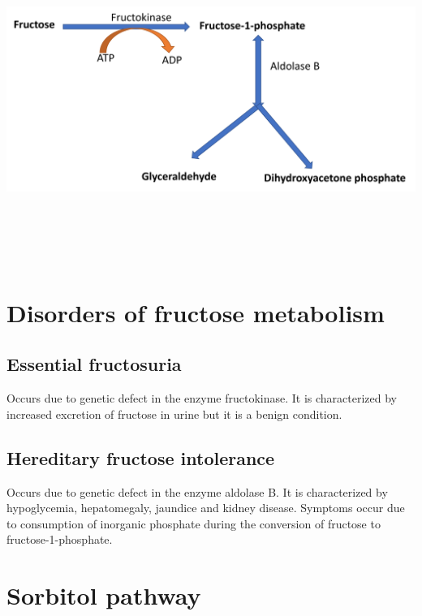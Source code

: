 \documentclass[
]{book}
\begin{document}
\includegraphics[width=\textwidth,height=4.16667in]{Images/Fructose2.png}

\section{Disorders of fructose metabolism}\label{disorders-of-fructose-metabolism}

\subsection{Essential fructosuria}\label{essential-fructosuria}

Occurs due to genetic defect in the enzyme fructokinase. It is characterized by increased excretion of fructose in urine but it is a benign condition.

\subsection{Hereditary fructose intolerance}\label{hereditary-fructose-intolerance}

Occurs due to genetic defect in the enzyme aldolase B. It is characterized by hypoglycemia, hepatomegaly, jaundice and kidney disease. Symptoms occur due to consumption of inorganic phosphate during the conversion of fructose to fructose-1-phosphate.

\section{Sorbitol pathway}\label{sorbitol-pathway-1}
\end{document}
